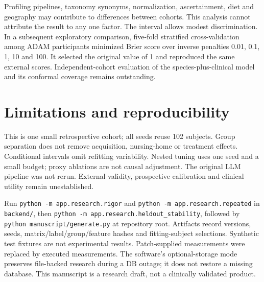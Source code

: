 \documentclass[manuscript,review,anonymous]{acmart}
\begin{document}
Profiling pipelines, taxonomy synonyms, normalization, ascertainment, diet and geography may contribute to differences between cohorts. This analysis cannot attribute the result to any one factor. The interval allows modest discrimination. In a subsequent exploratory comparison, five-fold stratified cross-validation among ADAM participants minimized Brier score over inverse penalties 0.01, 0.1, 1, 10 and 100. It selected the original value of 1 and reproduced the same external scores. Independent-cohort evaluation of the species-plus-clinical model and its conformal coverage remains outstanding.

\section{Limitations and reproducibility}
This is one small retrospective cohort; all seeds reuse 102 subjects. Group separation does not remove acquisition, nursing-home or treatment effects. Conditional intervals omit refitting variability. Nested tuning uses one seed and a small budget; proxy ablations are not causal adjustment. The original LLM pipeline was not rerun. External validity, prospective calibration and clinical utility remain unestablished.

Run \texttt{python -m app.research.rigor} and \texttt{python -m app.research.repeated} in \texttt{backend/}, then \texttt{python -m app.research.heldout\_stability}, followed by \texttt{python manuscript/generate.py} at repository root. Artifacts record versions, seeds, matrix/label/group/feature hashes and fitting-subject selections. Synthetic test fixtures are not experimental results. Patch-supplied measurements were replaced by executed measurements. The software's optional-storage mode preserves file-backed research during a DB outage; it does not restore a missing database. This manuscript is a research draft, not a clinically validated product.


\end{document}
